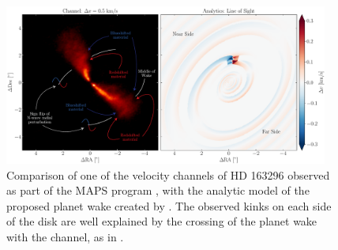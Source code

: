 \begin{figure}
    \centering
    \includegraphics[width = 0.95\textwidth]{figures/labeled_channel.pdf}
    \caption{Comparison of one of the velocity channels of HD 163296 observed as part of the MAPS program \citep{oberg2021}, with the analytic model \citep{bollati2021} of the proposed planet wake created by \citet{calcino2022}. The observed kinks on each side of the disk are well explained by the crossing of the planet wake with the channel, as in \citet{bollati2021}.}
    \label{fig:wake_channel}
\end{figure}